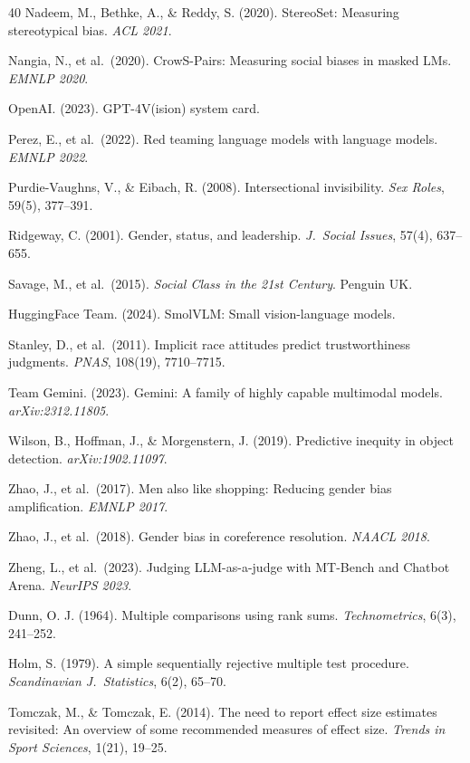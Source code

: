 \documentclass[letterpaper]{article} %
\begin{document}
\begin{thebibliography}{40}
Nadeem, M., Bethke, A., \& Reddy, S. (2020).
StereoSet: Measuring stereotypical bias.
\textit{ACL 2021}.

Nangia, N., et al.\ (2020).
CrowS-Pairs: Measuring social biases in masked LMs.
\textit{EMNLP 2020}.

OpenAI. (2023).
GPT-4V(ision) system card.

Perez, E., et al.\ (2022).
Red teaming language models with language models.
\textit{EMNLP 2022}.

Purdie-Vaughns, V., \& Eibach, R. (2008).
Intersectional invisibility.
\textit{Sex Roles}, 59(5), 377--391.

Ridgeway, C. (2001).
Gender, status, and leadership.
\textit{J.\ Social Issues}, 57(4), 637--655.

Savage, M., et al.\ (2015).
\textit{Social Class in the 21st Century}.
Penguin UK.

HuggingFace Team. (2024).
SmolVLM: Small vision-language models.

Stanley, D., et al.\ (2011).
Implicit race attitudes predict trustworthiness judgments.
\textit{PNAS}, 108(19), 7710--7715.

Team Gemini. (2023).
Gemini: A family of highly capable multimodal models.
\textit{arXiv:2312.11805}.

Wilson, B., Hoffman, J., \& Morgenstern, J. (2019).
Predictive inequity in object detection.
\textit{arXiv:1902.11097}.

Zhao, J., et al.\ (2017).
Men also like shopping: Reducing gender bias amplification.
\textit{EMNLP 2017}.

Zhao, J., et al.\ (2018).
Gender bias in coreference resolution.
\textit{NAACL 2018}.

Zheng, L., et al.\ (2023).
Judging LLM-as-a-judge with MT-Bench and Chatbot Arena.
\textit{NeurIPS 2023}.

Dunn, O. J. (1964).
Multiple comparisons using rank sums.
\textit{Technometrics}, 6(3), 241--252.

Holm, S. (1979).
A simple sequentially rejective multiple test procedure.
\textit{Scandinavian J.\ Statistics}, 6(2), 65--70.

Tomczak, M., \& Tomczak, E. (2014).
The need to report effect size estimates revisited: An overview of some recommended measures of effect size.
\textit{Trends in Sport Sciences}, 1(21), 19--25.

\end{thebibliography}
\end{document}
